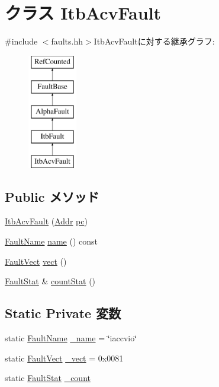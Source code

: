 \hypertarget{classAlphaISA_1_1ItbAcvFault}{
\section{クラス ItbAcvFault}
\label{classAlphaISA_1_1ItbAcvFault}
}


{\ttfamily \#include $<$faults.hh$>$}ItbAcvFaultに対する継承グラフ:\begin{figure}[H]
\begin{center}
\leavevmode
\includegraphics[height=5cm]{classAlphaISA_1_1ItbAcvFault}
\end{center}
\end{figure}
\subsection*{Public メソッド}
\begin{DoxyCompactItemize}
\item 
\hyperlink{classAlphaISA_1_1ItbAcvFault_aca2f01a9f9bd3bc50411a4f3e2be0840}{ItbAcvFault} (\hyperlink{classm5_1_1params_1_1Addr}{Addr} \hyperlink{classAlphaISA_1_1ItbFault_afed6bf9f08aaa7445161a391a719b7e4}{pc})
\item 
\hyperlink{sim_2faults_8hh_abb196df64725e5c2568c900cf130d8d7}{FaultName} \hyperlink{classAlphaISA_1_1ItbAcvFault_a73adb23259baf912a81683a9790a303f}{name} () const 
\item 
\hyperlink{classm5_1_1params_1_1Addr}{FaultVect} \hyperlink{classAlphaISA_1_1ItbAcvFault_ae15c5d7ab0162821b93d668d0b225198}{vect} ()
\item 
\hyperlink{classStats_1_1Scalar}{FaultStat} \& \hyperlink{classAlphaISA_1_1ItbAcvFault_a6c79663c761ff57265459f7e3aefaf4c}{countStat} ()
\end{DoxyCompactItemize}
\subsection*{Static Private 変数}
\begin{DoxyCompactItemize}
\item 
static \hyperlink{sim_2faults_8hh_abb196df64725e5c2568c900cf130d8d7}{FaultName} \hyperlink{classAlphaISA_1_1ItbAcvFault_ac79073ffcd2c66a09bcd3bd3ad206019}{\_\-name} = \char`\"{}iaccvio\char`\"{}
\item 
static \hyperlink{classm5_1_1params_1_1Addr}{FaultVect} \hyperlink{classAlphaISA_1_1ItbAcvFault_ad9e5855b9db0b2824cf6c507be4a872e}{\_\-vect} = 0x0081
\item 
static \hyperlink{classStats_1_1Scalar}{FaultStat} \hyperlink{classAlphaISA_1_1ItbAcvFault_a4bff925c412f331c5aaf6a39b79619ff}{\_\-count}
\end{DoxyCompactItemize}


